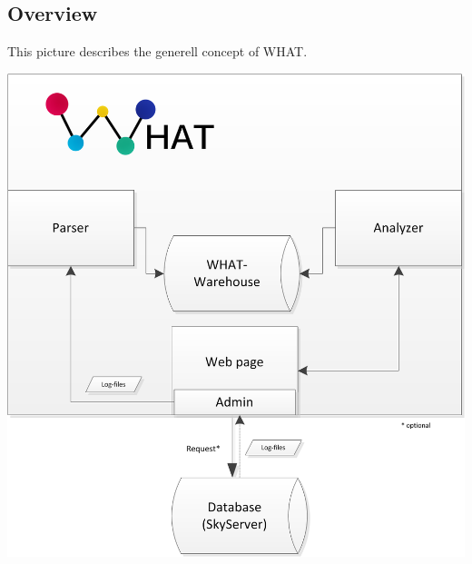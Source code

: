 \subsection{Overview}\label{overview}
This picture describes the generell concept of WHAT.
\begin{center}
\includegraphics[width=1\linewidth]{Pictures/GenerellConcept.png}
\end{center} 

\newpage
